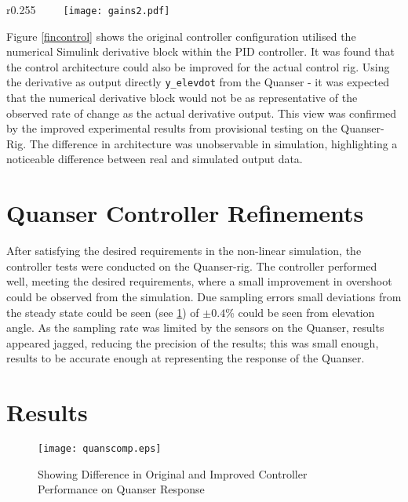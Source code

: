 \begin{wrapfigure}{r}{0.255\textwidth}
\vspace{-30pt}
 \centering
 \texttt{[image: gains2.pdf]}
 \label{gains}
\vspace{-20pt}
 \end{wrapfigure}

Figure \ref{fincontrol} shows the original controller configuration
utilised the numerical Simulink derivative block within the PID
controller. It was found that the control architecture could also be
improved for the actual control rig. Using the derivative as output
directly \texttt{y\_elevdot} from the Quanser - it was expected that the
numerical derivative block would not be as representative of the
observed rate of change as the actual derivative output. This view was
confirmed by the improved experimental results from provisional testing
on the Quanser-Rig. The difference in architecture was unobservable in
simulation, highlighting a noticeable difference between real and
simulated output data.

\section{Quanser Controller
Refinements}\label{quanser-controller-refinements}

After satisfying the desired requirements in the non-linear simulation,
the controller tests were conducted on the Quanser-rig. The controller
performed well, meeting the desired requirements, where a small
improvement in overshoot could be observed from the simulation. Due
sampling errors small deviations from the steady state could be seen
(see \ref{quanscomp}) of \(\pm 0.4\)\% could be seen from elevation
angle. As the sampling rate was limited by the sensors on the Quanser,
results appeared jagged, reducing the precision of the results; this was
small enough, results to be accurate enough at representing the response
of the Quanser.

\section{Results}\label{results}

\begin{figure}[H]
 \centering
 \texttt{[image: quanscomp.eps]}
\caption{Showing Difference in Original and Improved Controller Performance on Quanser Response}
 \label{quanscomp}
 \end{figure}

